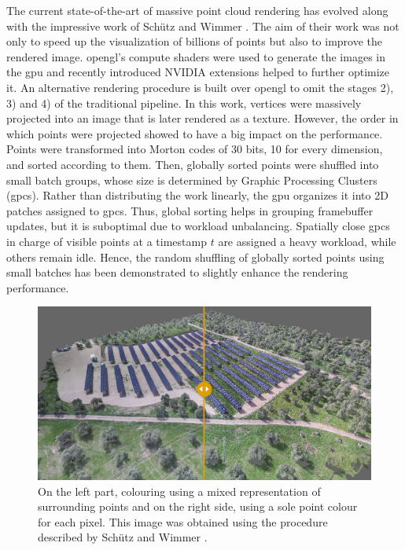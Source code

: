 The current state-of-the-art of massive point cloud rendering has evolved along with the impressive work of Schütz and Wimmer \cite{schutz_rendering_2019, schutz_rendering_2021}. The aim of their work was not only to speed up the visualization of billions of points but also to improve the rendered image. \acrshort{opengl}'s compute shaders were used to generate the images in the \acrshort{gpu} and recently introduced NVIDIA extensions helped to further optimize it. An alternative rendering procedure is built over \acrshort{opengl} to omit the stages 2), 3) and 4) of the traditional pipeline. In this work, vertices were massively projected into an image that is later rendered as a texture. However, the order in which points were projected showed to have a big impact on the performance. Points were transformed into Morton codes of 30 bits, 10 for every dimension, and sorted according to them. Then, globally sorted points were shuffled into small batch groups, whose size is determined by Graphic Processing Clusters (\acrshort{gpc}s). Rather than distributing the work linearly, the \acrshort{gpu} organizes it into 2D patches assigned to \acrshort{gpc}s. Thus, global sorting helps in grouping framebuffer updates, but it is suboptimal due to workload unbalancing. Spatially close \acrshort{gpc}s in charge of visible points at a timestamp $t$ are assigned a heavy workload, while others remain idle. Hence, the random shuffling of globally sorted points using small batches has been demonstrated to slightly enhance the rendering performance.

\begin{figure}[ht]
	\includegraphics[width=\textwidth]{figs/fundamentals/hqs_comparison.png}
	\caption{On the left part, colouring using a mixed representation of surrounding points and on the right side, using a sole point colour for each pixel. This image was obtained using the procedure described by Schütz and Wimmer \cite{schutz_rendering_2021}. }
    \label{fig:hqs_pc_rendering}
\end{figure}

